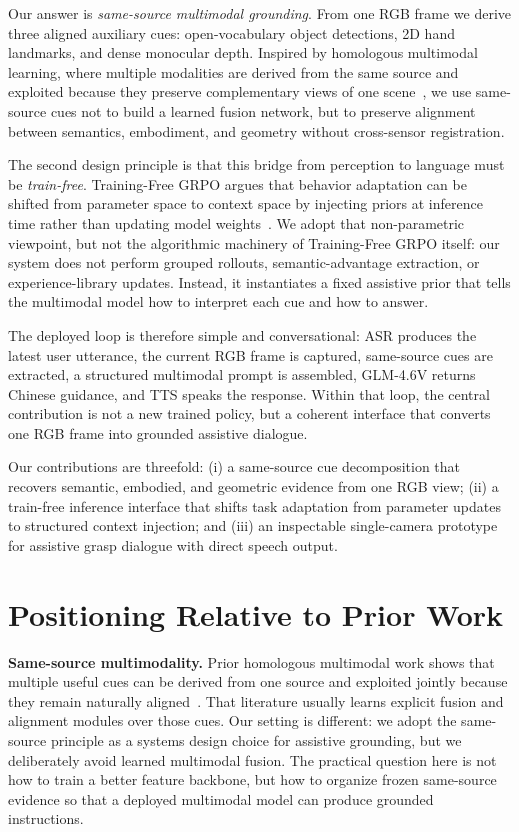 \documentclass[10pt,twocolumn,letterpaper]{article}
\begin{document}
Our answer is \emph{same-source multimodal grounding}. From one RGB frame we derive three aligned auxiliary cues: open-vocabulary object detections, 2D hand landmarks, and dense monocular depth. Inspired by homologous multimodal learning, where multiple modalities are derived from the same source and exploited because they preserve complementary views of one scene~\cite{xie2023hmjnd}, we use same-source cues not to build a learned fusion network, but to preserve alignment between semantics, embodiment, and geometry without cross-sensor registration.

The second design principle is that this bridge from perception to language must be \emph{train-free}. Training-Free GRPO argues that behavior adaptation can be shifted from parameter space to context space by injecting priors at inference time rather than updating model weights~\cite{cai2025tfgrpo}. We adopt that non-parametric viewpoint, but not the algorithmic machinery of Training-Free GRPO itself: our system does not perform grouped rollouts, semantic-advantage extraction, or experience-library updates. Instead, it instantiates a fixed assistive prior that tells the multimodal model how to interpret each cue and how to answer.

The deployed loop is therefore simple and conversational: ASR produces the latest user utterance, the current RGB frame is captured, same-source cues are extracted, a structured multimodal prompt is assembled, GLM-4.6V returns Chinese guidance, and TTS speaks the response. Within that loop, the central contribution is not a new trained policy, but a coherent interface that converts one RGB frame into grounded assistive dialogue.

Our contributions are threefold: (i) a same-source cue decomposition that recovers semantic, embodied, and geometric evidence from one RGB view; (ii) a train-free inference interface that shifts task adaptation from parameter updates to structured context injection; and (iii) an inspectable single-camera prototype for assistive grasp dialogue with direct speech output.

\section{Positioning Relative to Prior Work}
\textbf{Same-source multimodality.} Prior homologous multimodal work shows that multiple useful cues can be derived from one source and exploited jointly because they remain naturally aligned~\cite{xie2023hmjnd}. That literature usually learns explicit fusion and alignment modules over those cues. Our setting is different: we adopt the same-source principle as a systems design choice for assistive grounding, but we deliberately avoid learned multimodal fusion. The practical question here is not how to train a better feature backbone, but how to organize frozen same-source evidence so that a deployed multimodal model can produce grounded instructions.
\end{document}
